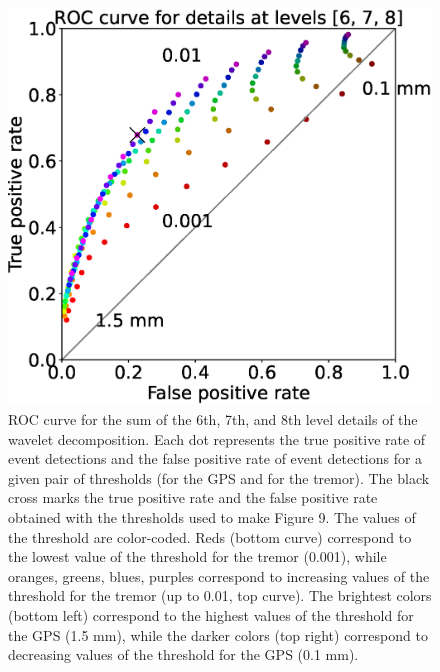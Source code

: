 \documentclass{article}
\begin{document}
\begin{figure}
\noindent\includegraphics[width=\textwidth, trim={0cm 0cm 0cm 0cm},clip]{figures/ROC_6-7-8.eps}
\caption{ROC curve for the sum of the 6th, 7th, and 8th level details of the wavelet decomposition. Each dot represents the true positive rate of event detections and the false positive rate of event detections for a given pair of thresholds (for the GPS and for the tremor). The black cross marks the true positive rate and the false positive rate obtained with the thresholds used to make Figure 9. The values of the threshold are color-coded. Reds (bottom curve) correspond to the lowest value of the threshold for the tremor (0.001), while oranges, greens, blues, purples correspond to increasing values of the threshold for the tremor (up to 0.01, top curve). The brightest colors (bottom left) correspond to the highest values of the threshold for the GPS (1.5 mm), while the darker colors (top right) correspond to decreasing values of the threshold for the GPS (0.1 mm).}
\label{pngfiguresample}
\end{figure}
\end{document}
